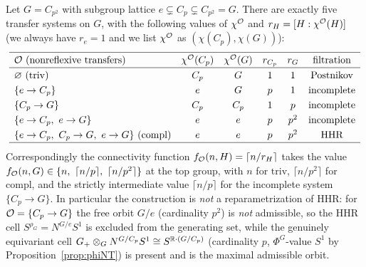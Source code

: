 \begin{qfiveproposition}
\label{prop:cpsq}
Let $G=C_{p^2}$ with subgroup lattice $e\subsetneq C_p\subsetneq C_{p^2}=G$.
There are exactly five transfer systems on $G$, with the following values of
$\chi^{\mathcal{O}}$ and $r_H=[H:\chi^{\mathcal{O}}(H)]$ (we always have $r_e=1$ and we list
$\chi^{\mathcal{O}}$ as $(\chi(C_p),\chi(G))$):
\[
\renewcommand{\arraystretch}{1.25}
\begin{array}{lccccc}
\hline
\qfiveaO\ (\text{nonreflexive transfers}) & \chi^\qfiveaO(C_p) & \chi^\qfiveaO(G) &
r_{C_p} & r_{G} & \text{filtration} \\
\hline
\varnothing\ (\mathrm{triv}) & C_p & G & 1 & 1 & \text{Postnikov}\\
\{e\to C_p\} & e & G & p & 1 & \text{incomplete}\\
\{C_p\to G\} & C_p & C_p & 1 & p & \text{incomplete}\\
\{e\to C_p,\ e\to G\} & e & e & p & p^2 & \text{incomplete}\\
\{e\to C_p,\ C_p\to G,\ e\to G\}\ (\mathrm{compl}) & e & e & p & p^2 &
\text{HHR}\\
\hline
\end{array}
\]
Correspondingly the connectivity function $f_{\mathcal{O}}(n,H)=\lceil n/r_H\rceil$ takes
the value $f_{\mathcal{O}}(n,G)\in\{n,\ \lceil n/p\rceil,\ \lceil n/p^2\rceil\}$ at the
top group, with $n$ for $\mathrm{triv}$, $\lceil n/p^2\rceil$ for $\mathrm{compl}$,
and the strictly intermediate value $\lceil n/p\rceil$ for the incomplete system
$\{C_p\to G\}$. In particular the construction is \emph{not} a reparametrization
of HHR: for $\mathcal{O}=\{C_p\to G\}$ the free orbit $G/e$ (cardinality $p^2$) is
\emph{not} admissible, so the HHR cell $S^{\rho_G}=N^{G/e}S^1$ is excluded from
the generating set, while the genuinely equivariant cell $G_+\otimes_G N^{G/C_p}S^1
\cong S^{\mathbb{R}\cdot(G/C_p)}$ (cardinality $p$, $\Phi^G$-value $S^{1}$ by
Proposition~\ref{prop:phiNT}) is present and is the maximal admissible orbit.
\end{qfiveproposition}

